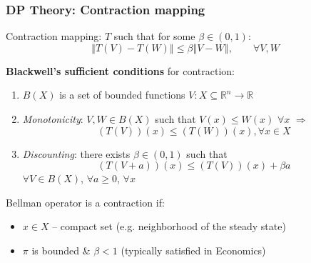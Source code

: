 \documentclass[bigger,handout]{beamer}
\newenvironment{stepitemize}{\begin{itemize}[<+->]}{\end{itemize} }
\begin{document}
\begin{frame}%

\frametitle{DP Theory: Contraction mapping}

Contraction mapping: $T$ such that for some $\beta \in (0,1)$:
\begin{equation*}
\left\Vert T(V)-T(W)\right\Vert \leq \beta \left\Vert V-W\right\Vert ,\qquad
\forall V,W
\end{equation*}

\textbf{Blackwell's sufficient conditions} for contraction:

\begin{enumerate}
\item $B(X)$ is a set of bounded functions $V:X\subseteq \mathbb{R}%
^{n}\rightarrow \mathbb{R}$

\item \emph{Monotonicity}: $V,W\in B(X)$ such that $V(x)\leq W(x)$ $\forall
x $ $\Rightarrow $%
\begin{equation*}
(T\left( V\right) )(x)\leq (T\left( W\right) )(x),\forall x\in X
\end{equation*}

\item \emph{Discounting}: there exists $\beta \in (0,1)$ such that
\begin{equation*}
(T(V+a))(x)\leq (T\left( V\right) )(x)+\beta a
\end{equation*}%
$\forall V\in B(X)$, $\forall a\geq 0$, $\forall x$
\end{enumerate}

Bellman operator is a contraction if:

\begin{stepitemize}
\item $x\in X$ -- compact set (e.g. neighborhood of the steady state)

\item $\pi $ is bounded \& $\beta <1$ (typically satisfied in Economics)
\end{stepitemize}



\end{frame}%
\end{document}
